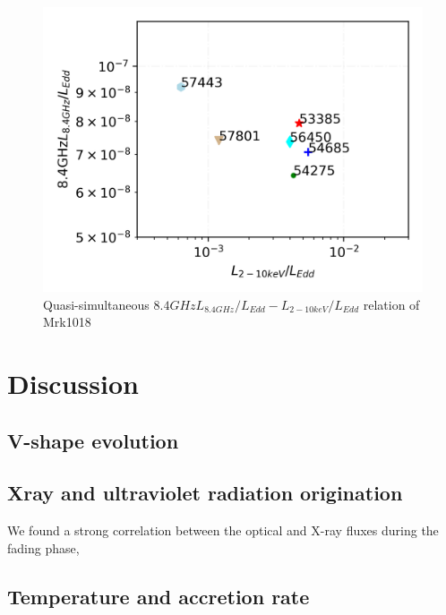 \documentclass{aastex63}
\begin{document}
\begin{figure}
\centering
	\includegraphics[width=0.7\columnwidth]{./pic/Mrk1018_radio_xray_sel1_rate.png}
    \caption{Quasi-simultaneous $8.4GHzL_{8.4GHz}/L_{Edd}-L_{2-10keV}/L_{Edd}$ relation of Mrk1018}
    \label{fig:radio-xray-relation}
\end{figure}






\section{Discussion}\label{sec:discussion}

\subsection{V-shape evolution}

\subsection{Xray and ultraviolet radiation origination}
We found a strong correlation between the optical and X-ray fluxes during the fading phase, %


\subsection{Temperature and accretion rate}



\acknowledgments
\end{document}
